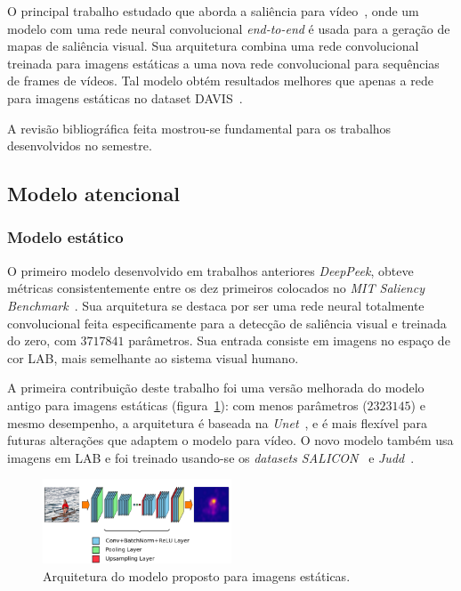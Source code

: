 \documentclass[article]{IEEEtran}
\newcommand{\tit}[1]{\textit{#1}}
\begin{document}
O principal trabalho estudado que aborda a saliência para vídeo~\cite{vidfix},
onde um modelo com uma rede neural convolucional \tit{end-to-end}
é usada para a geração de mapas de saliência visual.
Sua arquitetura combina uma rede convolucional treinada para imagens estáticas
a uma nova rede convolucional para sequências de frames de vídeos.
Tal modelo obtém resultados melhores que apenas a rede para imagens estáticas
no dataset DAVIS~\cite{davis}.

A revisão bibliográfica feita mostrou-se fundamental para os trabalhos
desenvolvidos no semestre.

\subsection{Modelo atencional}
\subsubsection{Modelo estático}
O primeiro modelo desenvolvido em trabalhos anteriores \tit{DeepPeek},
obteve métricas consistentemente entre os dez primeiros colocados no
\tit{MIT Saliency Benchmark}~\cite{mitsal}.
Sua arquitetura se destaca por ser uma rede neural totalmente convolucional
feita especificamente para a detecção de saliência visual e treinada
do zero, com $3717841$ parâmetros.
Sua entrada consiste em imagens no espaço de cor LAB, mais semelhante ao
sistema visual humano.

A primeira contribuição deste trabalho foi uma versão melhorada do
modelo antigo para imagens estáticas (figura~\ref{fig:unet}):
com menos parâmetros ($2323145$) e mesmo desempenho, a arquitetura é baseada na
\tit{Unet}~\cite{unet}, e é mais flexível para futuras alterações que adaptem
o modelo para vídeo.
O novo modelo também usa imagens em LAB e foi treinado usando-se os
\tit{datasets SALICON}~\cite{salicon} e \tit{Judd}~\cite{judd}.

\begin{center}
\begin{figure}[t]
\includegraphics[width=0.5\textwidth]{./img/unet.png}
\caption{Arquitetura do modelo proposto para imagens estáticas.}
\label{fig:unet}
\end{figure}
\end{center}
\end{document}
